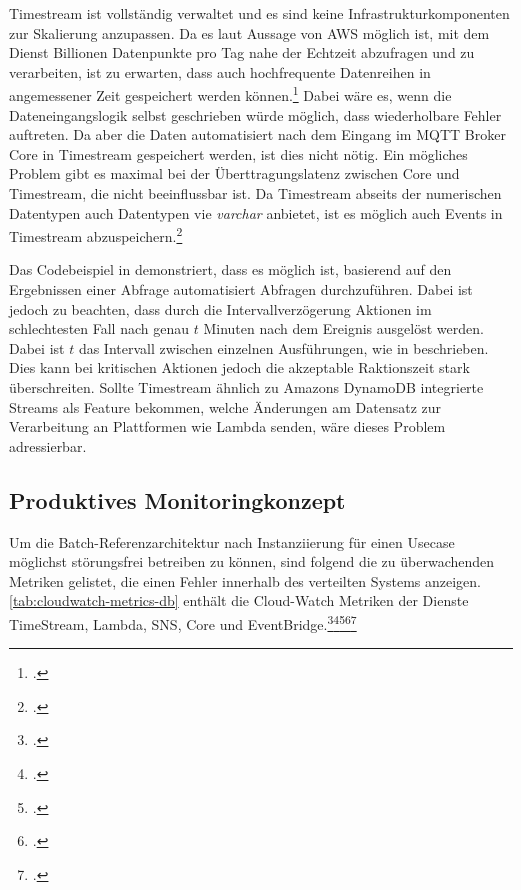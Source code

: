 Timestream ist vollständig verwaltet und es sind keine Infrastrukturkomponenten zur Skalierung anzupassen. Da es laut Aussage von \ac{AWS} möglich ist, mit dem Dienst Billionen Datenpunkte pro Tag nahe der Echtzeit abzufragen und zu verarbeiten, ist zu erwarten, dass auch hochfrequente Datenreihen in angemessener Zeit gespeichert werden können.\footcite[Vgl.][]{AmazonWebServicesInc..2020g} Dabei wäre es, wenn die Dateneingangslogik selbst geschrieben würde möglich, dass wiederholbare Fehler auftreten. Da aber die Daten automatisiert nach dem Eingang im \ac{MQTT} Broker \AWSIOT{} Core in Timestream gespeichert werden, ist dies nicht nötig. Ein mögliches Problem gibt es maximal bei der Überttragungslatenz zwischen \AWSIOT{} Core und Timestream, die nicht beeinflussbar ist.
Da Timestream abseits der numerischen Datentypen auch Datentypen vie \textit{varchar} anbietet, ist es möglich auch Events in Timestream abzuspeichern.\footcite[Vgl.][]{AmazonWebServicesInc..o.J.r}


Das Codebeispiel in  demonstriert, dass es möglich ist, basierend auf den Ergebnissen einer Abfrage automatisiert Abfragen durchzuführen. Dabei ist jedoch zu beachten, dass durch die Intervallverzögerung Aktionen im schlechtesten Fall nach genau $t$ Minuten nach dem Ereignis ausgelöst werden. Dabei ist $t$ das Intervall zwischen einzelnen Ausführungen, wie in  beschrieben. Dies kann bei kritischen Aktionen jedoch die akzeptable Raktionszeit stark überschreiten. Sollte Timestream ähnlich zu Amazons DynamoDB integrierte Streams als Feature bekommen, welche Änderungen am Datensatz zur Verarbeitung an Plattformen wie Lambda senden, wäre dieses Problem adressierbar.

\subsection{Produktives Monitoringkonzept}\label{subsection:Produktives-Monitoringkonzep-B}
Um die Batch-Referenzarchitektur nach Instanziierung für einen Usecase möglichst störungsfrei betreiben zu können, sind folgend die zu überwachenden Metriken gelistet, die einen Fehler innerhalb des verteilten Systems anzeigen. \autoref{tab:cloudwatch-metrics-db} enthält die Cloud-Watch Metriken der Dienste TimeStream, Lambda, \ac{SNS}, \AWSIOT{} Core und EventBridge.\footcite[Vgl.][]{AmazonWebServicesInc..o.J.be}\nzitat\footcite[Vgl.][]{AmazonWebServicesInc..o.J.bf}\nzitat\footcite[Vgl.][]{AmazonWebServicesInc..o.J.bc}\nzitat\footcite[Vgl.][]{AmazonWebServicesInc..o.J.az}\nzitat\footcite[Vgl.][]{AmazonWebServicesInc..o.J.bl}


